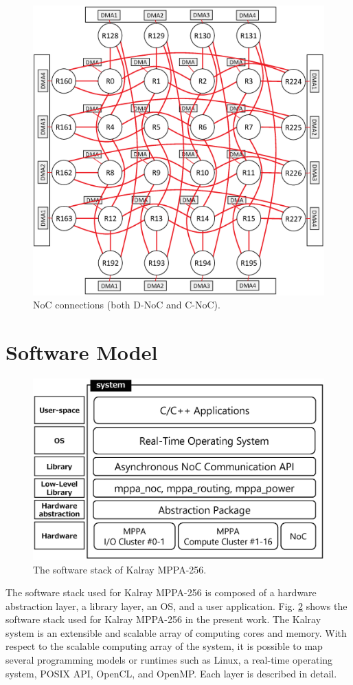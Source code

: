 \begin{figure}[H]
  \centering
  \includegraphics[width=0.7\linewidth]{../figure/noc_map.eps}
      \caption{\label{fig:noc_map}
    NoC connections (both D-NoC and C-NoC).}
\end{figure}

\section{Software Model}
\label{sec:software_model}

\begin{figure}[thbp]
  \centering
  \includegraphics[width=0.7\linewidth]{../figure/softwarestack.eps}   
  \caption{\label{fig:software_stack}
    The software stack of Kalray MPPA-256.}     
\end{figure}

The software stack used for Kalray MPPA-256 is composed of a hardware abstraction layer, a library layer, an OS, and a user application.  
Fig. \ref{fig:software_stack} shows the software stack used for Kalray MPPA-256 in the present work.
The Kalray system is an extensible and scalable array of computing cores and memory.
With respect to the scalable computing array of the system, it is possible to map several programming models or runtimes such as Linux, a real-time operating system, POSIX API, OpenCL, and OpenMP.
Each layer is described in detail.

